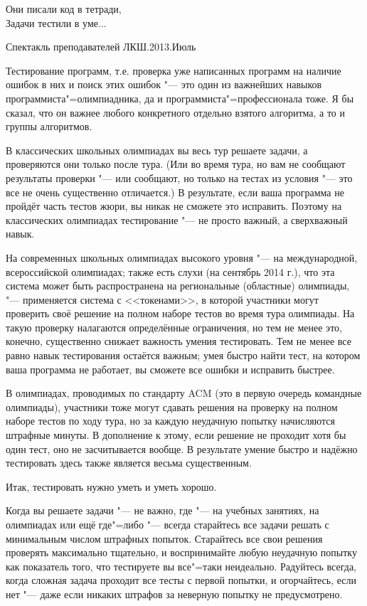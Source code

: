 

\epigraph{Они писали код в тетради,\\
Задачи тестили в уме...}{Спектакль преподавателей ЛКШ.2013.Июль}

Тестирование программ, т.е. проверка уже написанных программ на наличие ошибок в них и поиск этих ошибок "--- 
это один из важнейших навыков программиста"=олимпиадника, да и программиста"=профессионала тоже. 
Я бы сказал, что он важнее любого конкретного отдельно взятого алгоритма, а то и группы алгоритмов.

В классических школьных олимпиадах вы весь тур решаете задачи, а проверяются они только после тура. 
(Или во время тура, но вам не сообщают результаты проверки "--- или сообщают, но только на тестах из условия "--- это все не очень существенно отличается.) 
В результате, если ваша программа не пройдёт часть тестов жюри, вы никак не сможете это исправить. 
Поэтому на классических олимпиадах тестирование "--- не просто важный, а сверхважный навык.

На современных школьных олимпиадах высокого уровня "--- на международной, всероссийской олимпиадах; также есть слухи (на сентябрь 2014 г.), 
что эта система может быть распространена на региональные (областные) олимпиады, "--- применяется система с <<токенами>>, 
в которой участники могут проверить своё решение на полном наборе тестов во время тура олимпиады.
На такую проверку налагаются определённые ограничения, но тем не менее это, конечно, существенно снижает важность умения тестировать.
Тем не менее все равно навык тестирования остаётся важным; умея быстро найти тест, на котором ваша программа не работает, вы сможете все ошибки
и исправить быстрее.

В олимпиадах, проводимых по стандарту ACM (это в первую очередь командные олимпиады), участники тоже могут сдавать решения на проверку на полном наборе тестов по ходу тура, но за каждую неудачную попытку начисляются штрафные минуты. 
В дополнение к этому, если решение не проходит хотя бы один тест, оно не засчитывается вообще. 
В результате умение быстро и надёжно тестировать здесь также является весьма существенным.

Итак, тестировать нужно уметь и уметь хорошо.

Когда вы решаете задачи "--- не важно, где "--- на учебных занятиях, на олимпиадах или ещё где"=либо "--- всегда старайтесь все задачи решать с минимальным числом штрафных попыток. Старайтесь все свои решения проверять максимально тщательно, и воспринимайте любую неудачную попытку как показатель того, что тестируете вы все"=таки неидеально. Радуйтесь всегда, когда сложная задача проходит все тесты с первой попытки, и огорчайтесь, если нет "--- даже если никаких штрафов за неверную попытку не предусмотрено.

